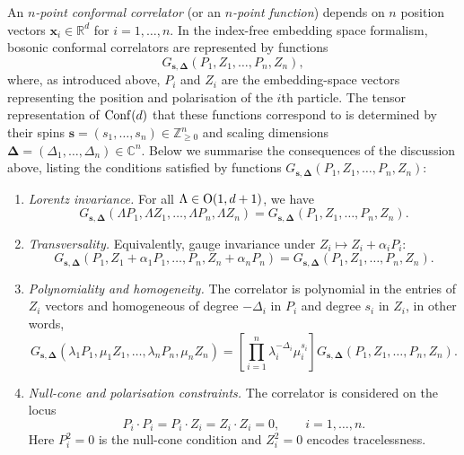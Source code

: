 \documentclass[12pt,a4paper]{extarticle}
\theoremstyle{definition}
\begin{document}
An \textit{$n$-point conformal correlator} (or an \emph{$n$-point function}) depends on $n$ position vectors
$\mathbf{x}_i\in\mathbb{R}^d$ for $i=1,\ldots,n$. In the index-free
embedding space formalism, bosonic conformal correlators are represented by functions
$$
G_{\mathbf{s},\mathbf{\Delta}}(P_1,Z_1,\ldots,P_n,Z_n),
$$
where, as introduced above, $P_i$ and $Z_i$ are the embedding-space vectors representing the position and polarisation of the $i$th particle. The tensor representation of ${\rm Conf}(d)$ that these functions correspond to is determined by  their spins
$\mathbf{s}=(s_1,\ldots,s_n)\in\mathbb{Z}_{\ge0}^n$ and scaling dimensions
$\mathbf{\Delta}=(\Delta_1,\ldots,\Delta_n)\in\mathbb{C}^n$. Below we
summarise the consequences of the discussion above, listing the conditions satisfied by functions $G_{\mathbf{s},\mathbf{\Delta}}(P_1,Z_1,\ldots,P_n,Z_n)$:
\begin{enumerate}
\itemsep0em
    \item \textit{Lorentz invariance.} For all $\Lambda\in{\rm O}(1,d+1)$, we have
    \begin{equation}\label{eq: Lorentz inv}
    G_{\mathbf{s},\mathbf{\Delta}}(\Lambda P_1,\Lambda Z_1,\ldots,\Lambda P_n,\Lambda Z_n)
    =
    G_{\mathbf{s},\mathbf{\Delta}}(P_1,Z_1,\ldots,P_n,Z_n).
    \end{equation}

    \item \textit{Transversality.} Equivalently, gauge invariance under
    $Z_i\mapsto Z_i+\alpha_iP_i$:
    \begin{equation}\label{eq: Transv inv}
    G_{\mathbf{s},\mathbf{\Delta}}(P_1,Z_1+\alpha_1P_1,\ldots,P_n,Z_n+\alpha_nP_n)
    =
    G_{\mathbf{s},\mathbf{\Delta}}(P_1,Z_1,\ldots,P_n,Z_n).
    \end{equation}

    \item \textit{Polynomiality and homogeneity.} The correlator is polynomial
    in the entries of $Z_i$ vectors and homogeneous of degree $-\Delta_i$ in $P_i$ and degree
    $s_i$ in $Z_i$, in other words,
    \begin{equation}\label{eq: homogeneity preliminaries}
        G_{\mathbf{s},\mathbf{\Delta}}(\lambda_1P_1,\mu_1Z_1,\ldots,\lambda_nP_n,\mu_nZ_n)
        =
        \left[\prod_{i=1}^n \lambda_i^{-\Delta_i}\mu_i^{s_i}\right]
        G_{\mathbf{s},\mathbf{\Delta}}(P_1,Z_1,\ldots,P_n,Z_n).
    \end{equation}

    \item \textit{Null-cone and polarisation constraints.} The correlator is
    considered on the locus
    \begin{equation}\label{eq: traceless}
       P_i\cdot P_i=P_i\cdot Z_i=Z_i\cdot Z_i=0,
       \qquad i=1,\ldots,n.
    \end{equation}
    Here $P_i^2=0$ is the
    null-cone condition and $Z_i^2=0$
    encodes tracelessness.
\end{enumerate}
\end{document}
